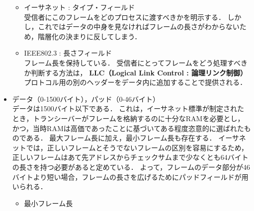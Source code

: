 \documentclass[a4paper]{ltjsarticle}
\begin{document}
\begin{itemize}
  \begin{itemize}
  \item
    イーサネット : タイプ・フィールド\\
    受信者にこのフレームをどのプロセスに渡すべきかを明示する．
    しかし，これではデータの中身を見なければフレームの長さがわからないため，階層化の決まりに反してしまう．
  \item
    IEEE802.3 : 長さフィールド\\
    フレーム長を保持している．
    受信者にとってフレームをどう処理すべきか判断する方法は，
    \textbf{LLC（Logical Link Control : 論理リンク制御）}
    プロトコル用の別のヘッダーをデータ内に追加することで提供される．
  \end{itemize}
\item
  データ（0-1500バイト），パッド（0-46バイト）\\
  データは1500バイト以下である．
  これは，イーサネット標準が制定されたとき，トランシーバーがフレームを格納するのに十分なRAMを必要とし，かつ，当時RAMは高価であったことに基づいてある程度恣意的に選ばれたものである．
  最大フレーム長に加え，最小フレーム長も存在する．
  イーサネットでは，正しいフレームとそうでないフレームの区別を容易にするため，正しいフレームはあて先アドレスからチェックサムまで少なくとも64バイトの長さを持つ必要があると定めている．
  よって，フレームのデータ部分が46バイトより短い場合，フレームの長さを広げるためにパッドフィールドが用いられる．

  \begin{itemize}
  \item
    最小フレーム長


\end{itemize}
\end{itemize}
\end{document}
